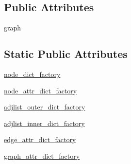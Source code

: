\subsection*{Public Attributes}
\begin{DoxyCompactItemize}
\item 
\hyperlink{classnetworkx_1_1classes_1_1graph_1_1Graph_a07bf0d549fc594dfd02bce6b0e207ed6}{graph}
\end{DoxyCompactItemize}
\subsection*{Static Public Attributes}
\begin{DoxyCompactItemize}
\item 
\hyperlink{classnetworkx_1_1classes_1_1graph_1_1Graph_afd649f442f94492033c2a11271575132}{node\+\_\+dict\+\_\+factory}
\item 
\hyperlink{classnetworkx_1_1classes_1_1graph_1_1Graph_a645eedd79fa75b20ef3c26e6bc34bb33}{node\+\_\+attr\+\_\+dict\+\_\+factory}
\item 
\hyperlink{classnetworkx_1_1classes_1_1graph_1_1Graph_a2dc3fe24b55b16360fd12b9a4a076909}{adjlist\+\_\+outer\+\_\+dict\+\_\+factory}
\item 
\hyperlink{classnetworkx_1_1classes_1_1graph_1_1Graph_ab593ab5fd9a3ba30a183ea504ad00e15}{adjlist\+\_\+inner\+\_\+dict\+\_\+factory}
\item 
\hyperlink{classnetworkx_1_1classes_1_1graph_1_1Graph_abdf72e9fb948187e5c018a437b5b2d26}{edge\+\_\+attr\+\_\+dict\+\_\+factory}
\item 
\hyperlink{classnetworkx_1_1classes_1_1graph_1_1Graph_a4622a017313e6aea3d733924dcfaf874}{graph\+\_\+attr\+\_\+dict\+\_\+factory}
\end{DoxyCompactItemize}


